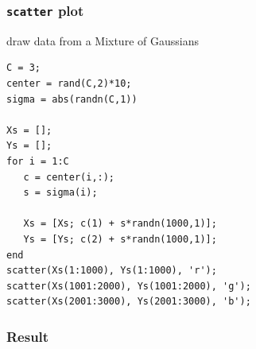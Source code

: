 \documentclass[11pt]{beamer}
\begin{document}
\begin{frame}[fragile]
  \frametitle{\texttt{scatter} plot}
  \Enlarge

  \begin{enumerate}
  \myitem  draw data from a Mixture of Gaussians
\begin{Verbatim}
C = 3;
center = rand(C,2)*10;
sigma = abs(randn(C,1))
  
Xs = [];
Ys = [];
for i = 1:C
   c = center(i,:);
   s = sigma(i);
  	
   Xs = [Xs; c(1) + s*randn(1000,1)];
   Ys = [Ys; c(2) + s*randn(1000,1)];
end
scatter(Xs(1:1000), Ys(1:1000), 'r');
scatter(Xs(1001:2000), Ys(1001:2000), 'g');
scatter(Xs(2001:3000), Ys(2001:3000), 'b');
\end{Verbatim} 
  \end{enumerate}

\end{frame}

\begin{frame}[fragile]
  \frametitle{Result}
  \Enlarge
\end{frame}
\end{document}
